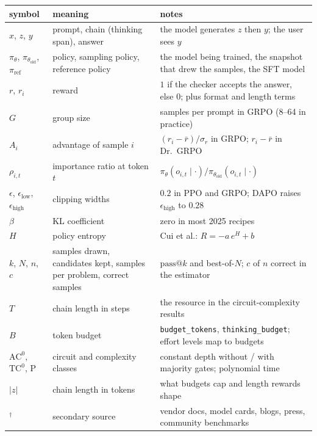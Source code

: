 \documentclass[11pt,letterpaper]{article}
\makeatletter
\newcommand{\passk}{\mathrm{pass}@k}
\makeatother
\begin{document}
\begin{center}\footnotesize\setlength{\tabcolsep}{4pt}
\begin{tabular}{@{}lp{4.6cm}p{6.6cm}@{}}
\toprule
symbol & meaning & notes\\
\midrule
$x$, $z$, $y$ & prompt, chain (thinking span), answer & the model generates $z$ then $y$; the user sees $y$\\
$\pi_\theta$, $\pi_{\theta_{\text{old}}}$, $\pi_{\text{ref}}$ & policy, sampling policy, reference policy & the model being trained, the snapshot that drew the samples, the SFT model\\
$r$, $r_i$ & reward & $1$ if the checker accepts the answer, else $0$; plus format and length terms\\
$G$ & group size & samples per prompt in GRPO (8--64 in practice)\\
$A_i$ & advantage of sample $i$ & $(r_i-\bar r)/\sigma_r$ in GRPO; $r_i-\bar r$ in Dr.\ GRPO\\
$\rho_{i,t}$ & importance ratio at token $t$ & $\pi_\theta(o_{i,t}\mid\cdot)/\pi_{\theta_{\text{old}}}(o_{i,t}\mid\cdot)$\\
$\epsilon$, $\epsilon_{\text{low}}$, $\epsilon_{\text{high}}$ & clipping widths & $0.2$ in PPO and GRPO; DAPO raises $\epsilon_{\text{high}}$ to $0.28$\\
$\beta$ & KL coefficient & zero in most 2025 recipes\\
$H$ & policy entropy & Cui et al.: $R=-a\,e^{H}+b$\\
$k$, $N$, $n$, $c$ & samples drawn, candidates kept, samples per problem, correct samples & $\passk$ and best-of-$N$; $c$ of $n$ correct in the estimator\\
$T$ & chain length in steps & the resource in the circuit-complexity results\\
$B$ & token budget & \texttt{budget\_tokens}, \texttt{thinking\_budget}; effort levels map to budgets\\
$\mathrm{AC}^0$, $\mathrm{TC}^0$, $\mathrm{P}$ & circuit and complexity classes & constant depth without / with majority gates; polynomial time\\
$|z|$ & chain length in tokens & what budgets cap and length rewards shape\\
$^\dagger$ & secondary source & vendor docs, model cards, blogs, press, community benchmarks\\
\bottomrule
\end{tabular}
\end{center}
\end{document}
